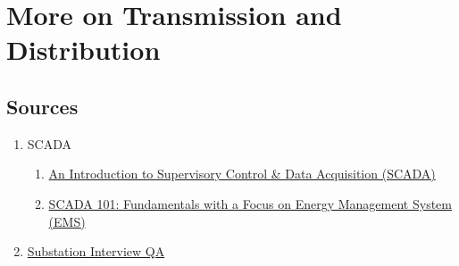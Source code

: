 \chapter{More on Transmission and Distribution}

\section{Sources}
\begin{enumerate}
    \item SCADA 
    \begin{enumerate}
        \item \href{https://www.solisplc.com/scada}{An Introduction to Supervisory Control \& Data Acquisition (SCADA)}
        \item \href{https://www.euci.com/event_post/scada-fundamentals-energy-management-system/}{SCADA 101: Fundamentals with a Focus on Energy Management System (EMS)}
    \end{enumerate}
    \item \href{https://www.eeeguide.com/substations-interview-questions-and-answers/}{Substation Interview QA}
\end{enumerate}